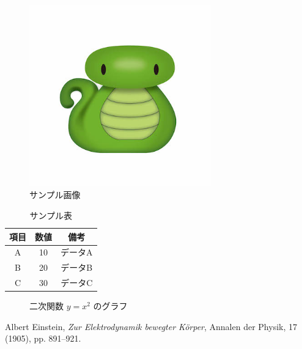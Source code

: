 \documentclass{article}
\begin{document}
\begin{figure}[htbp]
  \centering
  \includegraphics[width=0.7\textwidth]{Its_me.jpg}
  \caption{サンプル画像}
  \label{fig:sample}
\end{figure}

\begin{table}[htbp]
  \centering
  \caption{サンプル表}
  \begin{tabular}{|c|c|c|}
    \hline
    項目 & 数値 & 備考   \\
    \hline
    A  & 10 & データA \\
    B  & 20 & データB \\
    C  & 30 & データC \\
    \hline
  \end{tabular}
  \label{tab:sample}
\end{table}

\begin{figure}[htbp]
  \centering
  \caption{二次関数 $y = x^2$ のグラフ}
  \label{fig:quadratic}
  \cite{einstein1905}
\end{figure}

\begin{thebibliography}{9}
  Albert Einstein,
  \textit{Zur Elektrodynamik bewegter Körper},
  Annalen der Physik, 17 (1905), pp. 891–921.
\end{thebibliography}
\end{document}
